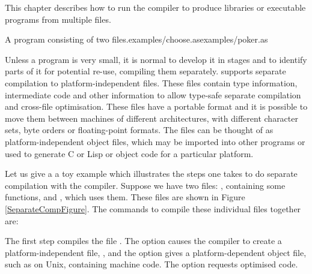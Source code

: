 

This chapter describes how to run the \asharp{} compiler to produce
libraries or executable programs from multiple files.

%
{A program consisting of two files.}{examples/choose.as}{examples/poker.as}

Unless a program is very small, it is normal to develop it in stages
and to identify parts of it for potential re-use, compiling them 
separately.  \asharp{} supports separate compilation to platform-independent
 files.
These files contain type information, intermediate code and other information
to allow type-safe separate compilation and cross-file optimisation.
These files have a portable format and it is possible to
move them between machines of different architectures, with different
character sets, byte orders or floating-point formats.
The  files can be thought of as platform-independent object files,
which may be imported into other \asharp{} programs or used to generate
C or Lisp or object code for a particular platform.

Let us give a a toy example which illustrates the steps one takes to
do separate compilation with the \asharp{} compiler.
Suppose we have two files: , containing some functions,
and , which uses them.
These files are shown in Figure \ref{SeparateCompFigure}.
The commands to compile these individual files together are:


The first step compiles the file .
The  option causes the compiler to create
a platform-independent file, , and the
 option gives a platform-dependent object file,
such as  on Unix, containing machine code.
The  option requests optimised code.

